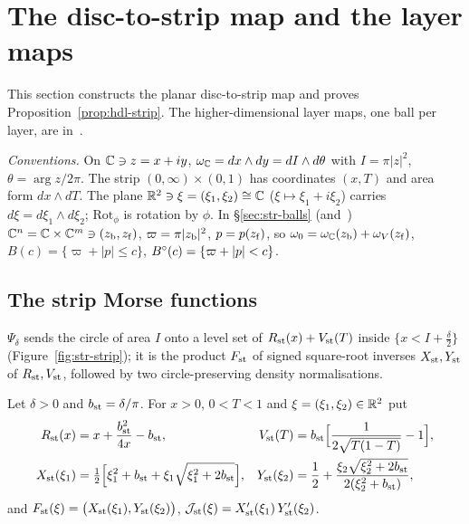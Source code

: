 \section{The disc-to-strip map and the layer maps}\label{sec:str}

This section constructs the planar disc-to-strip map and proves Proposition~\ref{prop:hdl-strip}. The higher-dimensional layer maps, one ball per layer, are in~\cite{SongHD}.

\medskip\noindent\emph{Conventions.}
On $\mathbb{C}\ni z=x+iy$, $\omega_{\mathbb{C}}=dx\wedge dy=dI\wedge d\theta$ with $I=\pi|z|^2$, $\theta=\arg z/2\pi$. The strip $(0,\infty)\times(0,1)$ has coordinates $(x,T)$ and area form $dx\wedge dT$. The plane $\mathbb{R}^2\ni\xi=(\xi_1,\xi_2)\cong\mathbb{C}$ ($\xi\mapsto\xi_1+i\xi_2$) carries $d\xi=d\xi_1\wedge d\xi_2$; $\mathrm{Rot}_\phi$ is rotation by $\phi$. In \S\ref{sec:str-balls} (and~\cite{SongHD}) $\mathbb{C}^n=\mathbb{C}\times\mathbb{C}^m\ni(z_{\rm b},z_{\rm f})$, $\varpi=\pi|z_{\rm b}|^2$, $p=p(z_{\rm f})$, so $\omega_0=\omega_{\mathbb{C}}(z_{\rm b})+\omega_V(z_{\rm f})$, $B(c)=\{\varpi+|p|\le c\}$, $B^{\circ}(c)=\{\varpi+|p|<c\}$.

\subsection{The strip Morse functions}\label{sec:str-morse}

$\Psi_\delta$ sends the circle of area $I$ onto a level set of $R_{\rm st}(x)+V_{\rm st}(T)$ inside $\{x<I+\frac\delta2\}$ (Figure~\ref{fig:str-strip}); it is the product $F_{\rm st}$ of signed square-root inverses $X_{\rm st},Y_{\rm st}$ of $R_{\rm st},V_{\rm st}$, followed by two circle-preserving density normalisations.

\begin{construction}\label{cons:str-morse}
Let $\delta>0$ and $b_{\rm st}=\delta/\pi$. For $x>0$, $0<T<1$ and $\xi=(\xi_1,\xi_2)\in\mathbb{R}^2$ put
\begin{align*}
 R_{\rm st}(x)&=x+\frac{b_{\rm st}^2}{4x}-b_{\rm st}, &
 V_{\rm st}(T)&=b_{\rm st}\Big[\frac{1}{2\sqrt{T(1-T)}}-1\Big],\\
 X_{\rm st}(\xi_1)&=\tfrac12\Big[\xi_1^2+b_{\rm st}+\xi_1\sqrt{\xi_1^2+2b_{\rm st}}\Big], &
 Y_{\rm st}(\xi_2)&=\frac12+\frac{\xi_2\sqrt{\xi_2^2+2b_{\rm st}}}{2(\xi_2^2+b_{\rm st})} ,
\end{align*}
and $F_{\rm st}(\xi)=\big(X_{\rm st}(\xi_1),Y_{\rm st}(\xi_2)\big)$, $\mathcal J_{\rm st}(\xi)=X_{\rm st}'(\xi_1)\,Y_{\rm st}'(\xi_2)$.
\end{construction}

